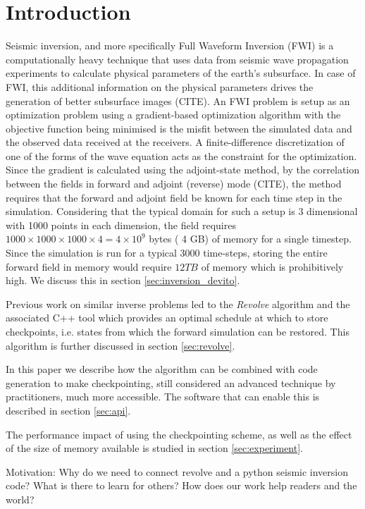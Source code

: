 \documentclass[sigconf]{acmart}
\begin{document}
\section{Introduction}
Seismic inversion, and more specifically Full Waveform Inversion (FWI)
is a computationally heavy technique that uses data from seismic wave
propagation experiments to calculate physical parameters of the
earth's subsurface. In case of FWI, this additional information on the
physical parameters drives the generation of better subsurface
images (CITE). An FWI problem is setup as an optimization problem using
a gradient-based optimization algorithm with the objective function
being minimised is the misfit between the simulated data and the
observed data received at the receivers. A finite-difference
discretization of one of the forms of the wave equation acts as the
constraint for the optimization. Since the gradient is calculated using the
adjoint-state method, by the correlation between the fields in forward
and adjoint (reverse) mode (CITE), the method requires that the forward and
adjoint field be known for each time step in the
simulation. Considering that the typical domain for such a setup is 3
dimensional with 1000 points in each dimension, the field requires
$1000 \times 1000 \times 1000 \times 4 = 4 \times 10^{9} $ bytes ( 4
GB) of memory for a single timestep. Since the simulation is run for a
typical $3000$ time-steps, storing the entire forward field in memory
would require $12 TB$ of memory which is prohibitively high. We
discuss this in section \ref{sec:inversion_devito}. 

Previous work on similar inverse problems led to the \emph{Revolve}
algorithm \cite{griewank2000} and the associated C++ tool which
provides an optimal schedule at which to store checkpoints,
i.e. states from which the forward simulation can be restored. This
algorithm is further discussed in section \ref{sec:revolve}.

In this paper we describe how the algorithm can be combined with code
generation to make checkpointing, still considered an advanced
technique by practitioners, much more accessible. The software that
can enable this is described in section \ref{sec:api}. 

The performance impact of using the checkpointing scheme, as well as
the effect of the size of memory available is studied in section
\ref{sec:experiment}. 

Motivation: Why do we need to connect revolve and a python seismic inversion code? What is there to learn for others? How does our work help readers and the world?
\end{document}
